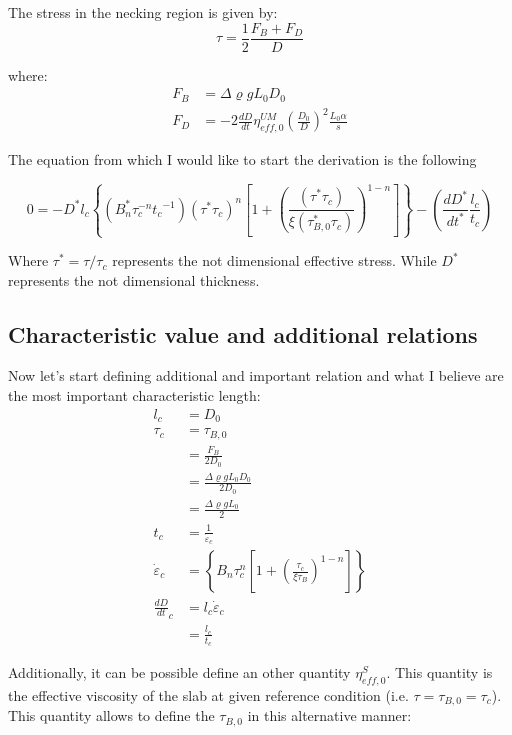 \documentclass{article}
\begin{document}
The stress in the necking region is given by:
\begin{equation}
    \tau = \frac{1}{2}\frac{F_B+F_D}{D}
\label{eq:effective_stress0}
\end{equation}

where: 
\begin{align}
    F_B &= \Delta \varrho g L_0 D_0 \\ 
    F_D &= -2\frac{dD}{dt}\eta^{UM}_{eff,0}\left(\frac{D_0}{D}\right)^2\frac{L_0 \alpha}{s}
    \label{eq:Drag_Force}
\end{align}

The equation from which I would like to start the derivation is the following

\begin{equation}
    0 = -D^{*} l_c \left\{ (B_n^{*} \tau_c^{-n}{t_c}^{-1})  \left(\tau^{*}\tau_c\right)^n \left[ 1+ \left( \frac{\left(\tau^{*}\tau_c\right)}{\xi (\tau^{*}_{B,0}\tau_c)} \right)^{1-n} \right] \right\} -\left(\frac{dD^{*}}{dt^{*}}\frac{l_c}{t_c}\right)
  \label{eq:Main_equation}
\end{equation}

Where $\tau^{*}= \tau/\tau_c$ represents the not dimensional effective stress. While $D^{*}$ represents the not dimensional thickness. 
\subsection{Characteristic value and additional relations}
Now let's start defining additional and important relation and what I believe are the most important characteristic length: 
\begin{align}
    l_c &= D_0 \\ 
    \tau_c &= \tau_{B,0}\\
    &= \frac{F_B}{2D_0} \\ 
    &= \frac{\Delta \varrho g L_0 D_0}{2 D_0} \\ 
    &= \frac{\Delta \varrho g L_0}{2}\\
    t_c &= \frac{1}{\dot{\varepsilon}_c} \\
    \dot{\varepsilon}_c &= \left\{ B_n \tau_c^n \left[ 1+ \left( \frac{\tau_c}{\xi \tau_B} \right)^{1-n} \right] \right\}\\
     \frac{dD}{dt}_{c} &= l_c \dot{\varepsilon}_c\\
     &= \frac{l_c}{t_c}
\end{align}

Additionally, it can be possible define an other quantity $\eta^S_{eff,0}$. This quantity is the effective viscosity of the slab at given reference condition (i.e. $\tau=\tau_{B,0}=\tau_c$). This quantity allows to define the $\tau_{B,0}$ in this alternative manner:
\end{document}

